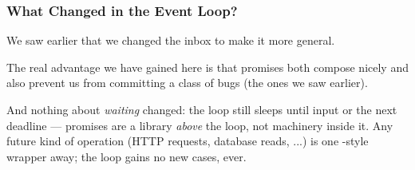 \documentclass[aspectratio=169]{beamer}
\begin{document}
\begin{frame}[fragile]
  \frametitle{What Changed in the Event Loop?}

  We saw earlier that we changed the inbox to make it more general.

  \pause
  \vspace{\fill}

  The real advantage we have gained here is that promises both
  compose nicely and also prevent us from committing a class of
  bugs (the ones we saw earlier).

  \pause
  \vspace{\fill}

  And nothing about \textit{waiting} changed: the loop still sleeps
  until input or the next deadline --- promises are a library
  \textit{above} the loop, not machinery inside it. Any future kind of
  operation (HTTP requests, database reads, ...) is one
  -style wrapper away; the loop gains no new cases, ever.
\end{frame}





\end{document}

